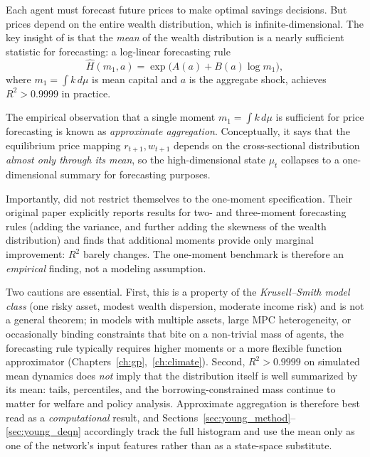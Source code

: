 \documentclass[11pt,a4paper]{report}
\begin{document}
Each agent must forecast future prices to make optimal savings decisions.  But prices depend on the entire wealth distribution, which is infinite-dimensional.  The key insight of \citet{krusell1998income} is that the \emph{mean} of the wealth distribution is a nearly sufficient statistic for forecasting: a log-linear forecasting rule
\begin{equation}
\hat{H}(m_1, a) = \exp\!\bigl(A(a) + B(a)\log m_1\bigr),
\label{eq:ks_forecast}
\end{equation}
where $m_1 = \int k\, d\mu$ is mean capital and $a$ is the aggregate shock, achieves $R^2 > 0.9999$ in practice.

\begin{remarkbox}
The empirical observation that a single moment $m_1 = \int k\,d\mu$ is sufficient for price forecasting is known as \emph{approximate aggregation}.  Conceptually, it says that the equilibrium price mapping $r_{t+1}, w_{t+1}$ depends on the cross-sectional distribution \emph{almost only through its mean}, so the high-dimensional state $\mu_t$ collapses to a one-dimensional summary for forecasting purposes.

Importantly, \citet{krusell1998income} did not restrict themselves to the one-moment specification.  Their original paper explicitly reports results for two- and three-moment forecasting rules (adding the variance, and further adding the skewness of the wealth distribution) and finds that additional moments provide only marginal improvement: $R^2$ barely changes.  The one-moment benchmark is therefore an \emph{empirical} finding, not a modeling assumption.

Two cautions are essential.  First, this is a property of the \emph{Krusell--Smith model class} (one risky asset, modest wealth dispersion, moderate income risk) and is not a general theorem; in models with multiple assets, large MPC heterogeneity, or occasionally binding constraints that bite on a non-trivial mass of agents, the forecasting rule typically requires higher moments or a more flexible function approximator (Chapters~\ref{ch:gp},~\ref{ch:climate}).  Second, $R^2 > 0.9999$ on simulated mean dynamics does \emph{not} imply that the distribution itself is well summarized by its mean: tails, percentiles, and the borrowing-constrained mass continue to matter for welfare and policy analysis.  Approximate aggregation is therefore best read as a \emph{computational} result, and Sections~\ref{sec:young_method}--\ref{sec:young_deqn} accordingly track the full histogram and use the mean only as one of the network's input features rather than as a state-space substitute.
\end{remarkbox}
\end{document}

